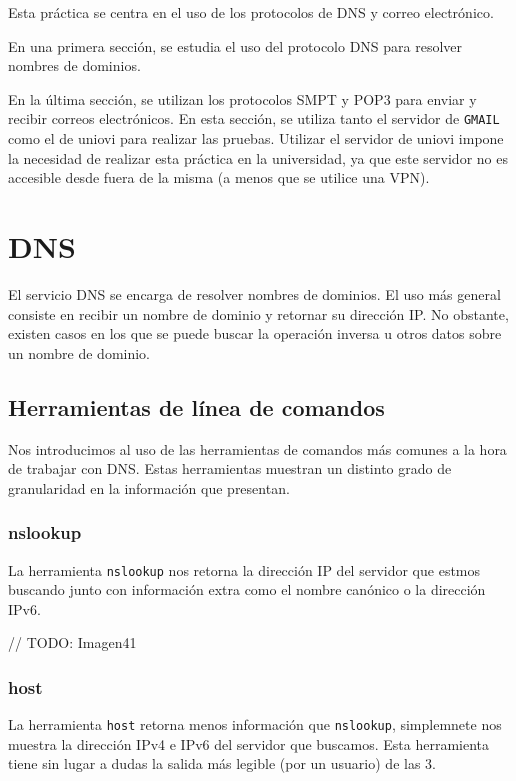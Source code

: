 
Esta práctica se centra en el uso de los protocolos de DNS y correo electrónico.

En una primera sección, se estudia el uso del protocolo DNS para resolver nombres de dominios.

En la última sección, se utilizan los protocolos SMPT y POP3 para enviar y recibir correos electrónicos.
En esta sección, se utiliza tanto el servidor de \verb#GMAIL# como el de uniovi para realizar las pruebas.
Utilizar el servidor de uniovi impone la necesidad de realizar esta práctica en la universidad,
ya que este servidor no es accesible desde fuera de la misma (a menos que se utilice una VPN).

\section{DNS}

El servicio DNS se encarga de resolver nombres de dominios.
El uso más general consiste en recibir un nombre de dominio y retornar su dirección IP.
No obstante, existen casos en los que se puede buscar la operación inversa u
otros datos sobre un nombre de dominio.

\subsection{Herramientas de línea de comandos}

Nos introducimos al uso de las herramientas de comandos más comunes a la hora de trabajar con DNS.
Estas herramientas muestran un distinto grado de granularidad en la información que presentan.

\subsubsection{nslookup}

La herramienta \verb#nslookup# nos retorna la dirección IP del servidor que estmos buscando
junto con información extra como el nombre canónico o la dirección IPv6.

// TODO: Imagen41

\subsubsection{host}

La herramienta \verb#host# retorna menos información que \verb#nslookup#,
simplemnete nos muestra la dirección IPv4 e IPv6 del servidor que buscamos. 
Esta herramienta tiene sin lugar a dudas la salida más legible (por un usuario) de las 3.

